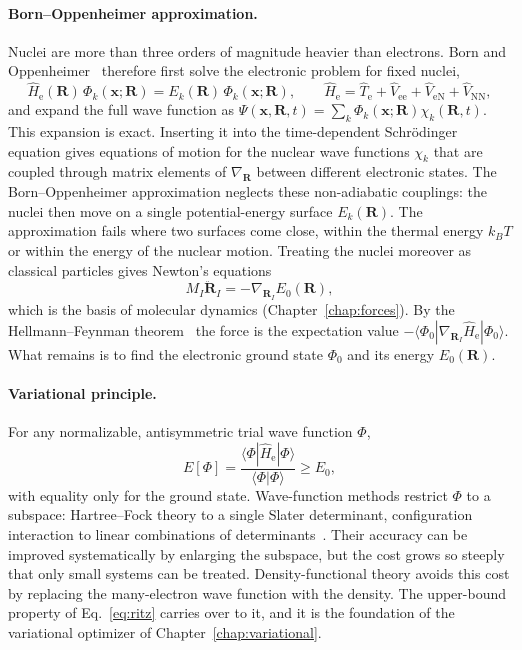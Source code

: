 \documentclass[11pt,a4paper,oneside]{book}
\newcommand{\bra}[1]{\langle #1|}
\newcommand{\ket}[1]{|#1\rangle}
\newcommand{\braket}[2]{\langle #1|#2\rangle}
\begin{document}
\paragraph{Born--Oppenheimer approximation.} Nuclei are more than three
orders of magnitude heavier than electrons. Born and
Oppenheimer~\cite{born27_ap84_457,born54_book} therefore first solve the
electronic problem for fixed nuclei,
\begin{equation}
  \hat H_{\mathrm e}(\bm R)\,\Phi_k(\bm x;\bm R)=E_k(\bm R)\,\Phi_k(\bm x;\bm R),
  \qquad
  \hat H_{\mathrm e}=\hat T_{\mathrm e}+\hat V_{\mathrm{ee}}+\hat V_{\mathrm{eN}}+\hat V_{\mathrm{NN}},
  \label{eq:bo}
\end{equation}
and expand the full wave function as
$\Psi(\bm x,\bm R,t)=\sum_k\Phi_k(\bm x;\bm R)\chi_k(\bm R,t)$. This
expansion is exact. Inserting it into the time-dependent Schr\"odinger
equation gives equations of motion for the nuclear wave functions
$\chi_k$ that are coupled through matrix elements of $\nabla_{\bm R}$
between different electronic states. The Born--Oppenheimer approximation
neglects these non-adiabatic couplings: the nuclei then move on a single
potential-energy surface $E_k(\bm R)$. The approximation fails where two
surfaces come close, within the thermal energy $k_BT$ or within the
energy of the nuclear motion. Treating the nuclei moreover as classical
particles gives Newton's equations
\begin{equation}
  M_I\ddot{\bm R}_I=-\nabla_{\bm R_I}E_0(\bm R),
\end{equation}
which is the basis of molecular dynamics (Chapter~\ref{chap:forces}).
By the Hellmann--Feynman theorem~\cite{Feynman1939} the force is the
expectation value $-\bra{\Phi_0}\nabla_{\bm R_I}\hat H_{\mathrm e}\ket{\Phi_0}$.
What remains is to find the electronic ground state $\Phi_0$ and its
energy $E_0(\bm R)$.

\paragraph{Variational principle.} For any normalizable, antisymmetric
trial wave function $\Phi$,
\begin{equation}
  E[\Phi]=\frac{\bra{\Phi}\hat H_{\mathrm e}\ket{\Phi}}{\braket{\Phi}{\Phi}}\ge E_0,
  \label{eq:ritz}
\end{equation}
with equality only for the ground state. Wave-function methods restrict
$\Phi$ to a subspace: Hartree--Fock theory to a single Slater
determinant, configuration interaction to linear combinations of
determinants~\cite{szabo89_book}. Their accuracy can be improved
systematically by enlarging the subspace, but the cost grows so steeply
that only small systems can be treated. Density-functional theory
avoids this cost by replacing the many-electron wave function with the
density. The upper-bound property of Eq.~\eqref{eq:ritz} carries over
to it, and it is the foundation of the variational optimizer of
Chapter~\ref{chap:variational}.
\end{document}
